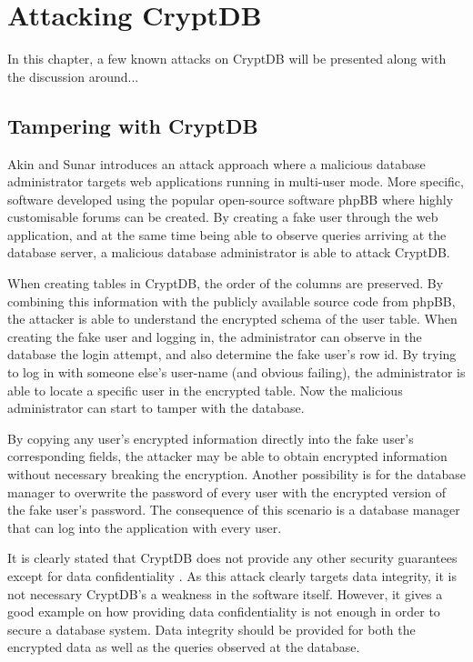 \chapter{Attacking CryptDB}
\label{chp:attacks}

In this chapter, a few known attacks on CryptDB will be presented along with the discussion around...

\section{Tampering with CryptDB}

Akin and Sunar \cite{akin_2014} introduces an attack approach where a malicious database administrator targets web applications running in multi-user mode. More specific, software developed using the popular open-source software phpBB \cite{phpBB} where highly customisable forums can be created. By creating a fake user through the web application, and at the same time being able to observe queries arriving at the database server, a malicious database administrator is able to attack CryptDB.

When creating tables in CryptDB, the order of the columns are preserved. By combining this information with the publicly available source code from phpBB, the attacker is able to understand the encrypted schema of the user table. When creating the fake user and logging in, the administrator can observe in the database the login attempt, and also determine the fake user's row id. By trying to log in with someone else's user-name (and obvious failing), the administrator is able to locate a specific user in the encrypted table. Now the malicious administrator can start to tamper with the database.

By copying any user's encrypted information directly into the fake user's corresponding fields, the attacker may be able to obtain encrypted information without necessary breaking the encryption. Another possibility is for the database manager to overwrite the password of every user with the encrypted version of the fake user's password. The consequence of this scenario is a database manager that can log into the application with every user.


It is clearly stated that CryptDB does not provide any other security guarantees except for data confidentiality \cite{CryptDB_Main_Paper}. As this attack clearly targets data integrity, it is not necessary CryptDB's a weakness in the software itself. However, it gives a good example on how providing data confidentiality is not enough in order to secure a database system. Data integrity should be provided for both the encrypted data as well as the queries observed at the database.

